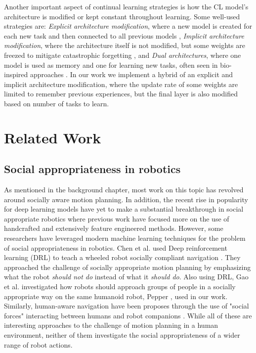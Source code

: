 \documentclass[a4paper,12pt]{report}
\begin{document}
Another important aspect of continual learning strategies is how the CL model's architecture is modified or kept constant throughout learning. Some well-used strategies are: \textit{Explicit architecture modification}, where a new model is created for each new task and then connected to all previous models \cite{rusu2016progressive}, \textit{Implicit architecture modification}, where the architecture itself is not modified, but some weights are freezed to mitigate catastrophic forgetting \cite{mallya2018packnet}, and \textit{Dual architectures}, where one model is used as memory and one for learning new tasks, often seen in bio-inspired approaches \cite{furlanello2016active}. In our work we implement a hybrid of an explicit and implicit architecture modification, where the update rate of some weights are limited to remember previous experiences, but the final layer is also modified based on number of tasks to learn.


\chapter{Related Work} 
\section{Social appropriateness in robotics}
As mentioned in the background chapter, most work on this topic has revolved around socially aware motion planning. In addition, the recent rise in popularity for deep learning models have yet to make a substantial breakthrough in social appropriate robotics where previous work have focused more on the use of handcrafted and extensively feature engineered methods. However, some researchers have leveraged modern machine learning techniques for the problem of social appropriateness in robotics. Chen et al. used Deep reinforcement learning (DRL)  to teach a wheeled robot socially compliant navigation \cite{chen2017socially}. They approached the challenge of socially appropriate motion planning by emphasizing what the robot \textit{should not do} instead of what it \textit{should do}. Also using DRL, Gao et al. \cite{gao2019learning} investigated how robots should approach groups of people in a socially appropriate way on the same humanoid robot, Pepper \cite{pepper}, used in our work. Similarly, human-aware navigation have been proposes through the use of "social forces" interacting between humans and robot companions \cite{ferrer2013robot}. While all of these are interesting approaches to the challenge of motion planning in a human environment, neither of them investigate the social appropriateness of a wider range of robot actions.
\end{document}
